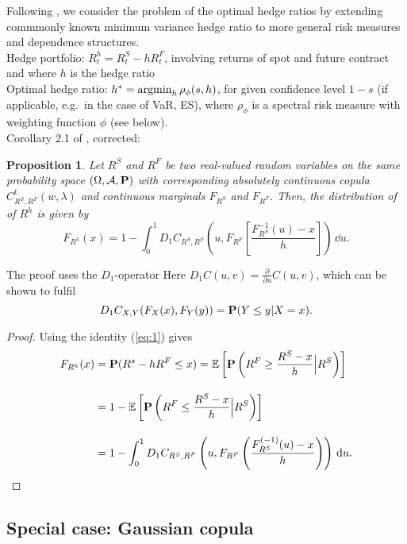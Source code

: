 \documentclass[square]{article} %
\theoremstyle{plain}
\newtheorem{proposition}[theorem]{Proposition}
\theoremstyle{definition} %
\begin{document}
Following \citep{Barbi2014}, we consider the problem of the optimal
hedge ratios by extending commmonly known minimum variance hedge ratio
to more general risk measures and dependence structures.\medskip\\
Hedge portfolio: $R_t^h = R_t^S - h R_t^F$, involving returns of spot
and future contract and where $h$ is the hedge ratio\\
Optimal hedge ratio: $h^\ast = \argmin_h \rho_\phi(s,h)$, for given
confidence level $1-s$ (if applicable, e.g.\ in the case of VaR, ES),
where $\rho_\phi$ is a spectral risk measure with weighting function
$\phi$ (see below). \\ 
Corollary 2.1 of \citep{Barbi2014}, corrected:
\begin{proposition}
  Let $R^S$ and $R^F$ be two real-valued random variables on the same
  probability space $(\Omega, \mathcal A, {\bf P})$ with corresponding
  absolutely continuous copula $C^t_{R^S, R^F}(w,\lambda)$ and
  continuous marginals $F_{R^S}$ and $F_{R^F}$. Then, the distribution
  of of $R^h$ is given by
  \begin{equation}
    \label{eq:3}
    F_{R^h}(x) = 1- \int^1_0 D_1 C_{R^S, R^F}
    \left( u, F_{R^F} \left[ \frac{F^{-1}_{R^S}(u)-x}{h} \right]
    \right)\, \dd u.  
  \end{equation}
\end{proposition}
The proof uses the $D_1$-operator 
Here $D_1 C(u,v)=\displaystyle \frac{\partial}{\partial u} C(u,v)$,
which can be shown to fulfil \citep{Cherubini2011}
\begin{equation}
  \label{eq:1}
  D_1 C_{X,Y}(F_X(x), F_Y(y)) = {\bf P}(Y\leq y|X=x).
\end{equation}
\begin{proof}
  Using the identity (\ref{eq:1}) gives
  \begin{align*}
    F_{R^h}(x) &= \p(R^s - h R^F\leq x) %
                 = \E\left[\p\left(R^F\geq \frac{R^S-x}{h}\Big|
                 R^S\right)\right]\\[10pt]
               &= 1-\E\left[\p\left(R^F\leq \frac{R^S-x}{h}\Big|
                 R^S\right)\right]\\[10pt] 
               &= 1- \int_0^1 D_1 C_{R^S, R^F}\left(u,
                 F_{R^F}\left(\frac{F^{(-1)}_{R^S}(u) -
                 x}{h}\right)\right)\, \dd u.
  \end{align*}
\end{proof}

\subsection{Special case: Gaussian copula}
\label{sec:spec-case:-gauss}
\end{document}
